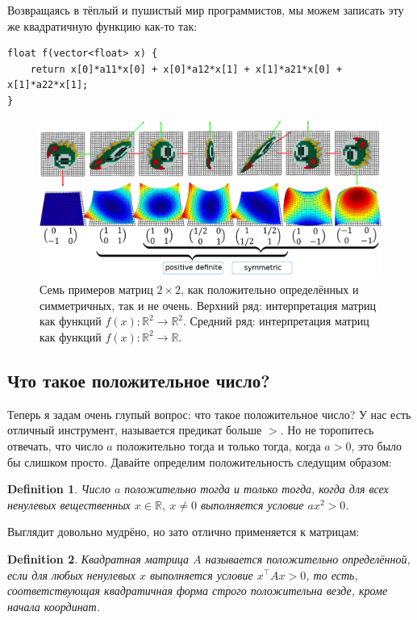 \documentclass{article}
\newtheorem{definition}{Definition}
\begin{document}
Возвращаясь в тёплый и пушистый мир программистов, мы можем записать эту же квадратичную функцию как-то так:
\begin{verbatim}    
float f(vector<float> x) {
    return x[0]*a11*x[0] + x[0]*a12*x[1] + x[1]*a21*x[0] + x[1]*a22*x[1];
}
\end{verbatim}

\begin{figure}[ht]
	\centering
	\includegraphics[width=\linewidth]{matrices}
	\caption{Семь примеров матриц $2\times 2$, как положительно определённых и симметричных, так и не очень. Верхний ряд: интерпретация матриц как функций $f(x):\mathbb R^2 \rightarrow \mathbb R^2$. Средний ряд: интерпретация матриц как функций $f(x):\mathbb R^2 \rightarrow \mathbb R$.}
	\label{fig:matrices}
\end{figure}


\subsection{Что такое положительное число?}
Теперь я задам очень глупый вопрос: что такое положительное число?
У нас есть отличный инструмент, называется предикат больше $>$.
Но не торопитесь отвечать, что число $a$ положительно тогда и только тогда, когда $a>0$, это было бы слишком просто. Давайте определим положительность следущим образом:
\begin{definition}
Число $a$ положительно тогда и только тогда, когда для всех ненулевых вещественных $x\in\mathbb R,\ x\neq 0$ выполняется условие $ax^2>0$.
\end{definition}

Выглядит довольно мудрёно, но зато отлично применяется к матрицам:

\begin{definition}
Квадратная матрица $A$ называется положительно определённой, если для любых ненулевых $x$
выполняется условие $x^\top A x > 0$, то есть, соответствующая квадратичная форма строго положительна везде, кроме начала координат.
\end{definition}
\end{document}
